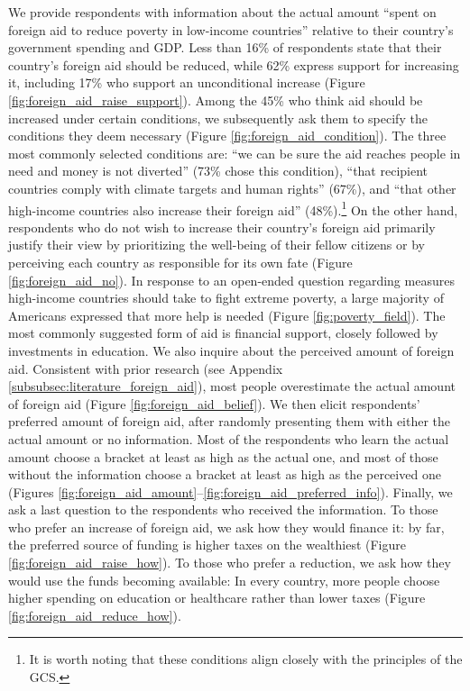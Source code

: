 We provide respondents with information about the actual amount ``spent on foreign aid to reduce poverty in low-income countries'' relative to their country's government spending and GDP. Less than 16\% of respondents state that their country's foreign aid should be reduced, while 62\% express support for increasing it, including 17\% who support an unconditional increase (Figure \ref{fig:foreign_aid_raise_support}). Among the 45\% who think aid should be increased under certain conditions, we subsequently ask them to specify the conditions they deem necessary (Figure \ref{fig:foreign_aid_condition}). The three most commonly selected conditions are: ``we can be sure the aid reaches people in need and money is not diverted'' (73\% chose this condition), ``that recipient countries comply with climate targets and human rights'' (67\%), and ``that other high-income countries also increase their foreign aid'' (48\%).\footnote{It is worth noting that these conditions align closely with the principles of the GCS.} 
On the other hand, respondents who do not wish to increase their country's foreign aid primarily justify their view by prioritizing the well-being of their fellow citizens or by perceiving each country as responsible for its own fate (Figure \ref{fig:foreign_aid_no}). In response to an open-ended question regarding measures high-income countries should take to fight extreme poverty, a large majority of Americans expressed that more help is needed (Figure \ref{fig:poverty_field}). The most commonly suggested form of aid is financial support, closely followed by investments in education. 
We also inquire about the perceived amount of foreign aid. Consistent with prior research (see Appendix \ref{subsubsec:literature_foreign_aid}), most people overestimate the actual amount of foreign aid (Figure \ref{fig:foreign_aid_belief}). We then elicit respondents' preferred amount of foreign aid, after randomly presenting them with either the actual amount or no information. Most of the respondents who learn the actual amount choose a bracket at least as high as the actual one, and most of those without the information choose a bracket at least as high as the perceived one (Figures \ref{fig:foreign_aid_amount}--\ref{fig:foreign_aid_preferred_info}). Finally, we ask a last question to the respondents who received the information. To those who prefer an increase of foreign aid, we ask how they would finance it: by far, the preferred source of funding is higher taxes on the wealthiest (Figure \ref{fig:foreign_aid_raise_how}). To those who prefer a reduction, we ask how they would use the funds becoming available: %
In every country, more people choose higher spending on education or healthcare rather than lower taxes (Figure \ref{fig:foreign_aid_reduce_how}). 

